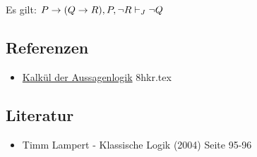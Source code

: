 \documentclass{sajzk}
\begin{document}
Es gilt: $P \rightarrow (Q\rightarrow R), P, \lnot R \vdash_J \lnot Q$
\subsection{Referenzen}
\begin{itemize}
    \item \href{8hkr.pdf}{Kalkül der Aussagenlogik} 8hkr.tex
\end{itemize}

\subsection{Literatur}
\begin{itemize}
    \item Timm Lampert - Klassische Logik (2004) Seite 95-96
\end{itemize}
\end{document}
